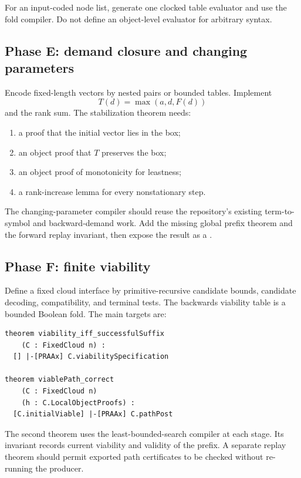 For an input-coded node list, generate one clocked table evaluator and use the fold compiler.  Do not define an object-level evaluator for arbitrary  syntax.

\subsection{Phase E: demand closure and changing parameters}

Encode fixed-length vectors by nested pairs or bounded tables.  Implement
\[
 T(d)=\max(a,d,F(d))
\]
and the rank sum.  The stabilization theorem needs:

\begin{enumerate}
  \item a proof that the initial vector lies in the box;
  \item an object proof that $T$ preserves the box;
  \item an object proof of monotonicity for leastness;
  \item a rank-increase lemma for every nonstationary step.
\end{enumerate}

The changing-parameter compiler should reuse the repository's existing term-to-symbol and backward-demand work.  Add the missing global prefix theorem and the forward replay invariant, then expose the result as a .

\subsection{Phase F: finite viability}

Define a fixed cloud interface by primitive-recursive candidate bounds, candidate decoding, compatibility, and terminal tests.  The backwards viability table is a bounded Boolean fold.  The main targets are:

\begin{lstlisting}[language=Lean]
theorem viability_iff_successfulSuffix
    (C : FixedCloud n) :
  [] |-[PRAAx] C.viabilitySpecification

theorem viablePath_correct
    (C : FixedCloud n)
    (h : C.LocalObjectProofs) :
  [C.initialViable] |-[PRAAx] C.pathPost
\end{lstlisting}

The second theorem uses the least-bounded-search compiler at each stage.  Its invariant records current viability and validity of the prefix.  A separate replay theorem should permit exported path certificates to be checked without re-running the producer.

